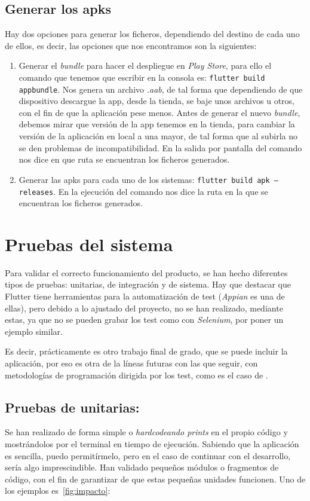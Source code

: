 \subsection{Generar los apks}
Hay dos opciones para generar los ficheros, dependiendo del destino de cada uno de ellos, es decir, las opciones que nos encontramos son la siguientes:
\begin{enumerate}
	\item Generar el \emph{bundle} para hacer el despliegue en \emph{Play Store}, para ello el comando que tenemos que escribir en la consola es: \texttt{flutter build appbundle}. Nos genera un archivo \emph{.aab}, de tal forma que dependiendo de que dispositivo descargue la app, desde la tienda, se baje unos archivos u otros, con el fin de que la aplicación pese menos.  Antes de generar el nuevo \emph{bundle}, debemos mirar que versión de la app tenemos en la tienda, para cambiar la versión de la aplicación en local a una mayor, de tal forma que al subirla no se den problemas de incompatibilidad. En la salida por pantalla del comando nos dice en que ruta se encuentran los ficheros generados.
	\item Generar las apks para cada uno de los sistemas: \texttt{flutter build apk --releases}. En la ejecución del comando nos dice la ruta en la que se encuentran los ficheros generados.
\end{enumerate} 

\section{Pruebas del sistema}
Para validar el correcto funcionamiento del producto, se han hecho diferentes tipos de pruebas: unitarias, de integración y de sistema. Hay que destacar que Flutter tiene herramientas para la automatización de test (\emph{Appian} es una de ellas), pero debido a lo ajustado del proyecto, no se han realizado, mediante estas, ya que no se pueden grabar los test como con \emph{Selenium}, por poner un ejemplo similar. 

Es decir, prácticamente es otro trabajo final de grado, que se puede incluir la aplicación, por eso es otra de la líneas futuras con las que seguir, con metodologías de programación dirigida por los test, como es el caso de .

\subsection{Pruebas de unitarias:}
Se han realizado de forma simple o \emph{hardcodeando prints} en el propio código y mostrándolos por el terminal en tiempo de ejecución. Sabiendo que la aplicación es sencilla, puedo permitírmelo, pero en el caso de continuar con el desarrollo, sería algo imprescindible. Han validado pequeños módulos o fragmentos de código, con el fin de garantizar de que estas pequeñas unidades funcionen. Uno de los ejemplos es~\ref{fig:impacto}:

